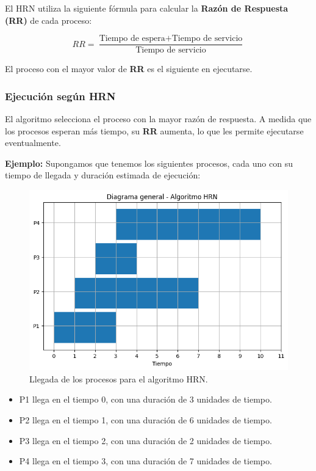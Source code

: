 El HRN utiliza la siguiente fórmula para calcular la \textbf{Razón de Respuesta (RR)} de cada proceso:

\[
RR = \frac{\text{Tiempo de espera} + \text{Tiempo de servicio}}{\text{Tiempo de servicio}}
\]

El proceso con el mayor valor de \textbf{RR} es el siguiente en ejecutarse.

\subsubsection{Ejecución según HRN}

El algoritmo selecciona el proceso con la mayor razón de respuesta. A medida que los procesos esperan más tiempo, su \textbf{RR} aumenta, lo que les permite ejecutarse eventualmente.

\textbf{Ejemplo:} Supongamos que tenemos los siguientes procesos, cada uno con su tiempo de llegada y duración estimada de ejecución:

\begin{figure}[H]
	\centering
	\includegraphics[width=0.8\linewidth]{Imagenes/diagrama_hrn.png}
	\caption{Llegada de los procesos para el algoritmo HRN.}
\end{figure}
\begin{itemize}
	\item P1 llega en el tiempo 0, con una duración de 3 unidades de tiempo.
	\item P2 llega en el tiempo 1, con una duración de 6 unidades de tiempo.
	\item P3 llega en el tiempo 2, con una duración de 2 unidades de tiempo.
	\item P4 llega en el tiempo 3, con una duración de 7 unidades de tiempo.
\end{itemize}



